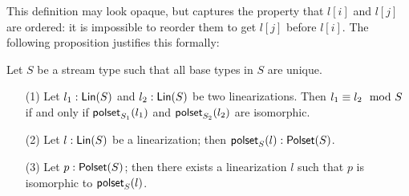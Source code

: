 This definition may look opaque, but captures the property that $l[i]$ and $l[j]$ are ordered: it is impossible to reorder them to get $l[j]$ before $l[i]$.
The following proposition justifies this formally:
\begin{proposition}
\label{prop:lin-poset-correspondence}
Let $S$ be a stream type such that all base types in $S$ are unique.
\begin{enumerate}
\item[(1)] Let $\lintype{l_1}{S}$ and $\lintype{l_2}{S}$ be two linearizations.
Then $\equivtype{l_1}{l_2}{S}$ if and only if $\posetlin{l_1}{S_1}$ and $\posetlin{l_2}{S_2}$ are isomorphic.
\item[(2)] Let $\lintype{l}{S}$ be a linearization; then $\posettype{\posetlin{l}{S}}{S}$.
\item[(3)] Let $\posettype{p}{S}$; then there exists a linearization $l$ such that $p$ is isomorphic to $\posetlin{l}{S}$.
\end{enumerate}
\end{proposition}
